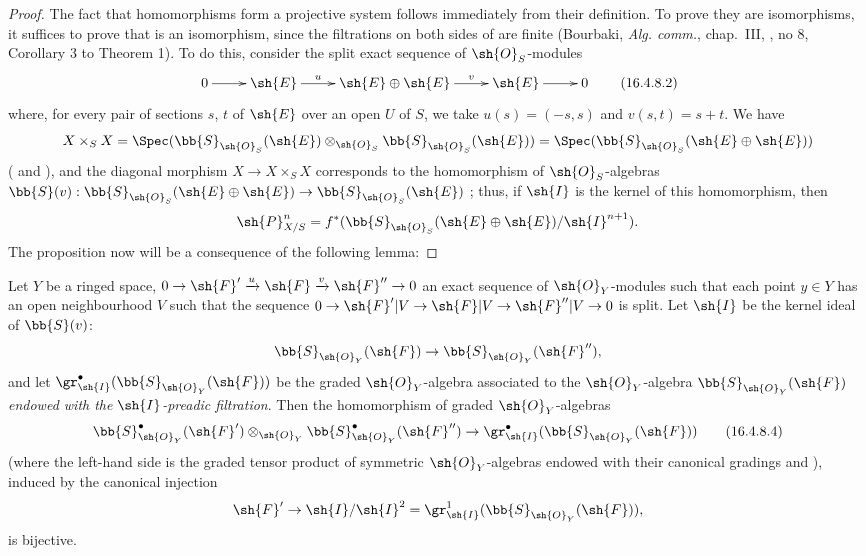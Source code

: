 \begin{proof}
The fact that homomorphisms  form a projective system follows immediately from their definition.
To prove they are isomorphisms, it suffices to 
prove that  is an isomorphism, since the filtrations on both sides of  are finite (Bourbaki, \emph{Alg. comm.}, chap.~III, , no 8, Corollary 3 to Theorem 1).
To do this, consider the split exact sequence of $\sh{O}_S$-modules
\[
  \label{IV.16.4.8.2}
  \xymatrix{
    0 \ar[r] & \sh{E} \ar[r]^-u & \sh{E} \oplus \sh{E} \ar[r]^-v & \sh{E} \ar[r] & 0
  }
  \tag{16.4.8.2}
\] 
where, for every pair of sections $s$, $t$ of $\sh{E}$ over an open $U$ of $S$, we take $u(s) = (-s, s)$ and $v(s,t) = s + t$.
We have
\[
  X \times_S X = \Spec(\bb{S}_{\sh{O}_S}(\sh{E}) \otimes_{\sh{O}_S} \bb{S}_{\sh{O}_S}(\sh{E})) = \Spec(\bb{S}_{\sh{O}_S}(\sh{E} \oplus \sh{E}))
\]
( and ), and the diagonal morphism $X \to X \times_S X$ corresponds  to the homomorphism of $\sh{O}_S$-algebras $\bb{S}(v): \bb{S}_{\sh{O}_S}(\sh{E} \oplus \sh{E}) \to \bb{S}_{\sh{O}_S}(\sh{E})$ ; thus, if $\sh{I}$ is the kernel of this homomorphism, then
\[
  \sh{P}_{X/S}^n = f^*(\bb{S}_{\sh{O}_S}(\sh{E} \oplus \sh{E})/\sh{I}^{n+1}).
\]
The proposition now will be a consequence of the following lemma:
\end{proof}

\begin{lemma}[16.4.8.3]
\label{IV.16.4.8.3}
Let $Y$ be a ringed space, $0 \to \sh{F}'  \xrightarrow{u} \sh{F} \xrightarrow{v} \sh{F}'' \to 0$ an exact sequence of $\sh{O}_Y$-modules such that each point $y \in Y$ has an open neighbourhood $V$ such that the sequence $0 \to \sh{F}'|V \to \sh{F}|V \to \sh{F}''|V \to 0$ is split.
Let $\sh{I}$ be the kernel ideal of $\bb{S}(v)$:
\[
  \bb{S}_{\sh{O}_Y}(\sh{F}) \to \bb{S}_{\sh{O}_Y}(\sh{F}''),
\]
and let $\gr_{\sh{I}}^\bullet(\bb{S}_{\sh{O}_Y}(\sh{F}))$ be the graded $\sh{O}_Y$-algebra associated to the $\sh{O}_Y$-algebra $\bb{S}_{\sh{O}_Y}(\sh{F})$ \emph{endowed with the $\sh{I}$-preadic filtration}.
Then the homomorphism of graded $\sh{O}_Y$-algebras
\[
  \label{IV.16.4.8.4}
  \bb{S}_{\sh{O}_Y}^\bullet(\sh{F}') \otimes_{\sh{O}_Y} \bb{S}_{\sh{O}_Y}^\bullet(\sh{F}'') \to \gr_{\sh{I}}^\bullet(\bb{S}_{\sh{O}_Y}(\sh{F}))
  \tag{16.4.8.4}
\]
(where the left-hand side is the graded tensor product of symmetric $\sh{O}_Y$-algebras endowed with their canonical gradings  and ), induced by the canonical injection
\[
  \sh{F}' \to \sh{I}/\sh{I}^2 = \gr_{\sh{I}}^1(\bb{S}_{\sh{O}_Y}(\sh{F})),
\]
is bijective.
\end{lemma}

